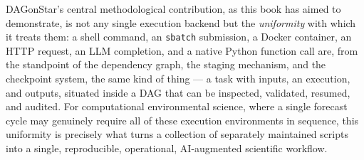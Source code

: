 DAGonStar's central methodological contribution, as this book has aimed to
demonstrate, is not any single execution backend but the \emph{uniformity}
with which it treats them: a shell command, an \texttt{sbatch} submission, a
Docker container, an HTTP request, an LLM completion, and a native Python
function call are, from the standpoint of the dependency graph, the staging
mechanism, and the checkpoint system, the same kind of thing --- a task with
inputs, an execution, and outputs, situated inside a DAG that can be
inspected, validated, resumed, and audited. For computational environmental
science, where a single forecast cycle may genuinely require all of these
execution environments in sequence, this uniformity is precisely what turns
a collection of separately maintained scripts into a single, reproducible,
operational, AI-augmented scientific workflow.
